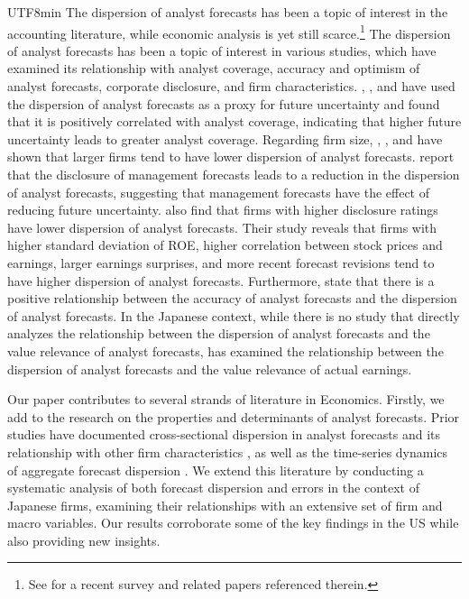 \documentclass[12pt, a4paper]{article}
\begin{document}
\begin{CJK}{UTF8}{min}
The dispersion of analyst forecasts has been a topic of interest in the accounting literature, while 
economic analysis is yet still scarce.\footnote{See \citet{NaraNoma2024} for a recent survey and related papers referenced therein.}
The dispersion of analyst forecasts has been a topic of interest in various studies, which have examined its relationship with analyst coverage, accuracy and optimism of analyst forecasts, corporate disclosure, and firm characteristics. \citet{Diether2002}, \citet{Ciccone2003}, and \citet{LiuNatarajan2012} have used the dispersion of analyst forecasts as a proxy for future uncertainty and found that it is positively correlated with analyst coverage, indicating that higher future uncertainty leads to greater analyst coverage.
Regarding firm size, \citet{LangLundholm1996}, \citet{Diether2002}, and \citet{LiuNatarajan2012} have shown that larger firms tend to have lower dispersion of analyst forecasts. \citet{Clement2003} report that the disclosure of management forecasts leads to a reduction in the dispersion of analyst forecasts, suggesting that management forecasts have the effect of reducing future uncertainty.
\citet{LangLundholm1996} also find that firms with higher disclosure ratings have lower dispersion of analyst forecasts. Their study reveals that firms with higher standard deviation of ROE, higher correlation between stock prices and earnings, larger earnings surprises, and more recent forecast revisions tend to have higher dispersion of analyst forecasts.
Furthermore, \citet{Brown1987a} state that there is a positive relationship between the accuracy of analyst forecasts and the dispersion of analyst forecasts.
In the Japanese context, while there is no study that directly analyzes the relationship between the dispersion of analyst forecasts and the value relevance of analyst forecasts, \citet{Obinata2010} has examined the relationship between the dispersion of analyst forecasts and the value relevance of actual earnings.

Our paper contributes to several strands of literature in Economics.
Firstly, we add to the research on the properties and determinants of analyst forecasts. 
Prior studies have documented cross-sectional dispersion in analyst forecasts and its relationship with other firm characteristics \cite{hong2000bad, brennan2000investment, diether2002differences}, 
as well as the time-series dynamics of aggregate forecast dispersion \cite{yu2011analyst, barinov2022firm}. 
We extend this literature by conducting a systematic analysis of both forecast dispersion and errors in the context of Japanese firms, 
examining their relationships with an extensive set of firm and macro variables. 
Our results corroborate some of the key findings in the US while also providing new insights.


\end{CJK}
\end{document}
